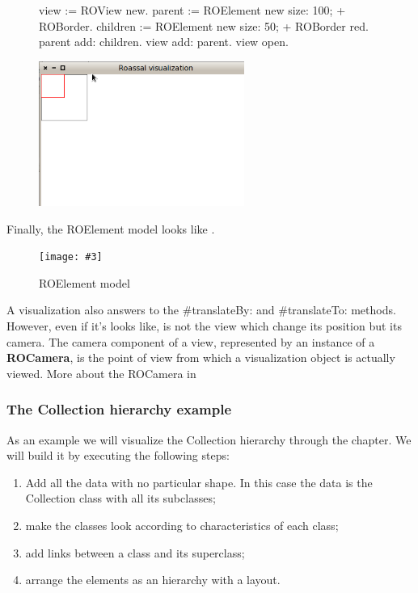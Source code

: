 \documentclass[a4paper,10pt,twoside]{book}
\newcommand{\fig}[4]{
		\begin{figure}[#1]
			\centering
			\texttt{[image: \#3]}
			\caption{\label{fig:#3}#4}
		\end{figure}}
\begin{document}
\begin{figure}[H]
      \begin{minipage}[t]{0.5\textwidth}
      \vspace{0pt}
\begin{code}{}
view := ROView new.
parent := ROElement new 
				size: 100;
				+ ROBorder.
children := ROElement new 
				size: 50;
				+ ROBorder red.
parent add: children.
view add: parent.
view open.
\end{code}
   \end{minipage}
   \hfill
   \begin{minipage}[t]{0.6\textwidth}
      \vspace{0pt} \raggedright
       \centering
		\includegraphics[width=0.6\textwidth]{ex5}
   \end{minipage}
\label{fig:ex5}
\end{figure}

Finally, the ROElement model looks like .

\fig{H}{0.5}{ROElementModel}{ROElement model}

A visualization also answers to the \#translateBy: and \#translateTo: methods. However, even if it's looks like, is not the view which change its position but its camera. The camera component of a view, represented by an instance of a \textbf{ROCamera}, is the point of view from which a visualization object is actually viewed. More about the ROCamera in 

\subsubsection*{The Collection hierarchy example}
As an example we will visualize the Collection hierarchy through the chapter. We will build it by executing the following steps:
\begin{enumerate}
\item Add all the data with no particular shape. In this case the data is the Collection class with all its subclasses;
\item make the classes look according to characteristics of each class;
\item add links between a class and its superclass;
\item arrange the elements as an hierarchy with a layout.
\end{enumerate}
\end{document}
